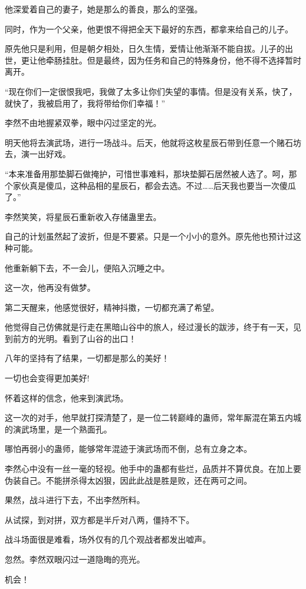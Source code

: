 \begin{this_body}
他深爱着自己的妻子，她是那么的善良，那么的坚强。

同时，作为一个父亲，他更恨不得把全天下最好的东西，都拿来给自己的儿子。

原先他只是利用，但是朝夕相处，日久生情，爱情让他渐渐不能自拔。儿子的出世，更让他牵肠挂肚。但是最终，因为任务和自己的特殊身份，他不得不选择暂时离开。

“现在你们一定很恨我吧，我做了太多让你们失望的事情。但是没有关系，快了，就快了，我被启用了，我将带给你们幸福！”

李然不由地握紧双拳，眼中闪过坚定的光。

明天他将去演武场，进行一场战斗。后天，他就将这枚星辰石带到任意一个赌石坊去，演一出好戏。

“本来准备用那垫脚石做掩护，可惜世事难料，那块垫脚石居然被人选了。呵，那个家伙真是傻瓜，这种品相的星辰石，都会去选。不过……后天我也要当一次傻瓜了。”

李然笑笑，将星辰石重新收入存储蛊里去。

自己的计划虽然起了波折，但是不要紧。只是一个小小的意外。原先他也预计过这种可能。

他重新躺下去，不一会儿，便陷入沉睡之中。

这一次，他再没有做梦。

第二天醒来，他感觉很好，精神抖擞，一切都充满了希望。

他觉得自己仿佛就是行走在黑暗山谷中的旅人，经过漫长的跋涉，终于有一天，见到前方的光明。看到了山谷的出口！

八年的坚持有了结果，一切都是那么的美好！

一切也会变得更加美好!

怀着这样的信念，他来到演武场。

这一次的对手，他早就打探清楚了，是一位二转巅峰的蛊师，常年厮混在第五内城的演武场里，是一个熟面孔。

哪怕再弱小的蛊师，能够常年混迹于演武场而不倒，总有立身之本。

李然心中没有一丝一毫的轻视。他手中的蛊都有些烂，品质并不算优良。在加上要伪装自己。不能拼杀得太凶狠，因此此战是胜是败，还在两可之间。

果然，战斗进行下去，不出李然所料。

从试探，到对拼，双方都是半斤对八两，僵持不下。

战斗场面很是难看，场外仅有的几个观战者都发出嘘声。

忽然。李然双眼闪过一道隐晦的亮光。

机会！


\end{this_body}
